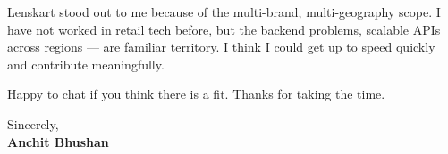 \documentclass[letterpaper,11pt]{article}
\begin{document}
\vspace{8pt}

Lenskart stood out to me because of the multi-brand, multi-geography scope. I have not worked in retail tech before, but the backend problems, scalable APIs across regions — are familiar territory. I think I could get up to speed quickly and contribute meaningfully.

\vspace{8pt}

Happy to chat if you think there is a fit. Thanks for taking the time.

\vspace{16pt}

\noindent Sincerely, \\[4pt]
\textbf{Anchit Bhushan}
\end{document}
